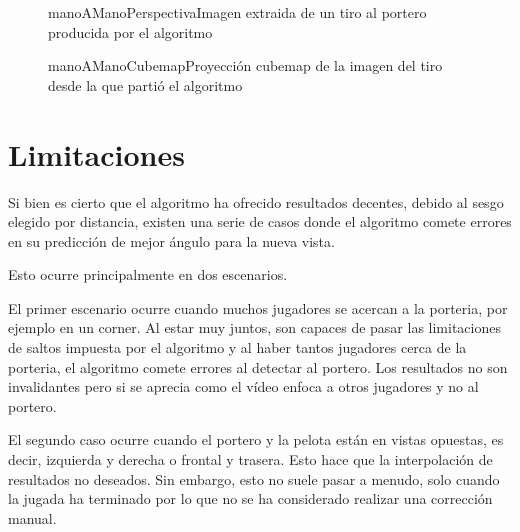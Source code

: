 \begin{figure}[Imagen de mano a mano producida por el algoritmo]{manoAManoPerspectiva}{Imagen extraida de un tiro al portero producida por el algoritmo}
\end{figure}

\begin{figure}[Proyección de la imagen mano a mano en vista cubemap]{manoAManoCubemap}{Proyección cubemap de la imagen del tiro desde la que partió el algoritmo}
\end{figure}

\section{Limitaciones}
Si bien es cierto que el algoritmo ha ofrecido resultados decentes, debido al sesgo elegido por distancia, existen una serie de casos donde el algoritmo comete errores en su predicción de mejor ángulo para la nueva vista.

Esto ocurre principalmente en dos escenarios.

El primer escenario ocurre cuando muchos jugadores se acercan a la porteria, por ejemplo en un corner. Al estar muy juntos, son capaces de pasar las limitaciones de saltos impuesta por el algoritmo y al haber tantos jugadores cerca de la porteria, el algoritmo comete errores al detectar al portero. Los resultados no son invalidantes pero si se aprecia como el vídeo enfoca a otros jugadores y no al portero.

El segundo caso ocurre cuando el portero y la pelota están en vistas opuestas, es decir, izquierda y derecha o frontal y trasera. Esto hace que la interpolación de resultados no deseados. Sin embargo, esto no suele pasar a menudo, solo cuando la jugada ha terminado por lo que no se ha considerado realizar una corrección manual.



